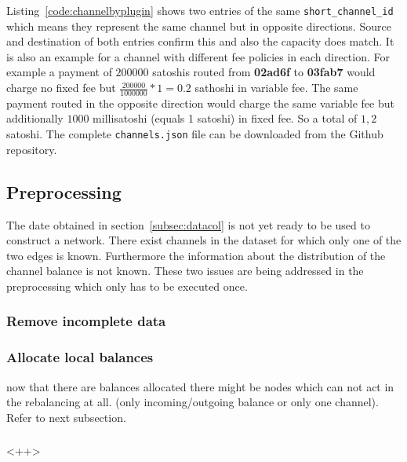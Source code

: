 \documentclass[final]{fhnwreport}       %
\begin{document}
Listing~\ref{code:channelbyplugin} shows two entries of the same \texttt{short\_channel\_id} which means they represent the same channel but in opposite directions. Source and destination of both entries confirm this and also the capacity does match. It is also an example for a channel with different fee policies in each direction. For example a payment of $200000$ satoshis routed from \textbf{02ad6f} to \textbf{03fab7} would charge no fixed fee but $\frac{200000}{1000000}*1 = 0.2$ sathoshi in variable fee. The same payment routed in the opposite direction would charge the same variable fee but additionally $1000$ millisatoshi (equals 1 satoshi) in fixed fee. So a total of $1,2$ satoshi. The complete \texttt{channels.json} file can be downloaded from the Github repository. 

\subsection{Preprocessing}\label{subsec:preproc}
The date obtained in section~\ref{subsec:datacol} is not yet ready to be used to construct a network. There exist channels in the dataset for which only one of the two edges is known. Furthermore the information about the distribution of the channel balance is not known. These two issues are being addressed in the preprocessing which only has to be executed once.

\subsubsection{Remove incomplete data}

\subsubsection{Allocate local balances}
now that there are balances allocated there might be nodes which can not act in the rebalancing at all. (only incoming/outgoing balance or only one channel). Refer to next subsection.

\subsubsection{}<++>
\end{document}
